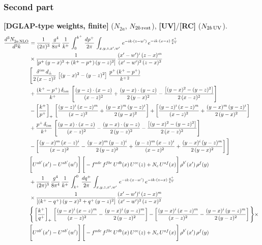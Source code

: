 \documentclass[9pt]{article}
\numberwithin{equation}{section}
\begin{document}
\subsubsection*{Second part}
\textbf{[DGLAP-type weights, finite]} ($N_{2a}$, $N_{2b\,\rm rest}$), \textbf{[UV]}/\textbf{[RC]} ($N_{2b\,\rm UV}$).
\begin{align}
    \frac{d^{3}N_{2a\,\rm NLO}^{\rm}}{d^{3}k}  & =  \frac{1}{(2\pi)^{3}}\, \frac{g^{4}}{8\pi^{4}}\,\frac{1}{k^{+}}\,\int_{0}^{k^{+}}\, \frac{dp^{+}}{2\pi}\,\int_{x,y,z,x',w'}\, e^{-ik\cdot(z-w')}\,e^{-ik\cdot (x-z)\,\frac{p^{+}}{k^{+}}}\notag \\ & \times\frac{1}{\left[p^{+}\,(y-x)^{2}+(k^{+}-p^{+})\,(y-z)^{2}\right]}\, \frac{(x'-w')^{i}\,(z-x)^{m}}{(x'-w')^{2}\,(z-x)^{2}} \notag \\ & \Bigg[\frac{\delta^{im}\,d_{\perp}}{2\,(x-z)^{2}}\,\left[(y-x)^{2}-(y-z)^{2}\right]\,\frac{p^{+}\,(k^{+}-p^{+})}{k^{+\,2}}\notag \\ & +\frac{(k^{+}-p^{+})\,\delta_{im}}{k^{+}}\,\left[\frac{(y-z)\cdot (x-z)}{(x-z)^{2}}+\frac{(y-x)\cdot (y-z)}{2\,(y-x)^{2}}-\frac{\left[(y-x)^{2}-(y-z)^{2}\right]}{2\,(x-z)^{2}}\right]\notag \\ & -\left[\frac{k^{+}}{p^{+}}\right]_{+}\,\left[\frac{(y-z)^{i}\,(x-z)^{m}}{(x-z)^{2}}+\frac{(y-x)^{m}\,(y-z)^{i}}{2\,(y-x)^{2}}\right]+ \left[\frac{(y-z)^{i}\,(x-z)^{m}}{(x-z)^{2}}+\frac{(y-x)^{m}\,(y-z)^{i}}{2\,(y-x)^{2}}\right]\notag \\ & +\frac{p^{+}\,\delta_{im}}{k^{+}}\,\left[\frac{(y-x)\cdot (x-z)}{(x-z)^{2}}-\frac{(y-x)\cdot (y-z)}{2\,(y-z)^{2}}-\frac{\left[(y-x)^{2}-(y-z)^{2}\right]}{2\,(x-z)^{2}}\right]\notag \\ &-\left[\frac{(y-x)^{m}\,(x-z)^{i}}{(x-z)^{2}}-\frac{(y-x)^{m}\,(y-z)^{i}}{2\,(y-z)^{2}}+\frac{(y-z)^{m}\,(x-z)^{i}}{(x-z)^{2}}+\frac{(y-x)^{i}\,(y-z)^{m}}{2\,(y-x)^{2}}\right]\Bigg] \notag \\ & \Bigg[U^{ab'}(x')-U^{ab'}(w')\Bigg]\,\Bigg[-f^{adc}\,f^{fbe}\,U^{db}(x)\,U^{ce}(z)+N_{c}\,U^{af}(x)\Bigg]\,\rho^{b'}(x')\,\rho^{f}(y)\notag \\ & + \frac{1}{(2\pi)^{3}}\,\frac{g^{4}}{8\pi^{4}}\,\frac{1}{k^{+}}\, \int^{0}_{k^{+}}\, \frac{dq^{+}}{2\pi} \,  \int_{x,y,z,x',w'}\,e^{-ik\cdot(x-w')}\,e^{-ik\cdot (z-x)\,\frac{q^{+}}{k^{+}}}\notag \\ & \times\frac{1}{\left[(k^{+}-q^{+})\,(y-x)^{2}+q^{+}\,(y-z)^{2}\right]}\, \frac{(x'-w')^{i}\,(z-x)^{m}}{(x'-w')^{2}\,(z-x)^{2}} \notag \\ &\Bigg\{\left[\frac{k^{+}}{q^{+}}\right]_{+}\,\left[\frac{(y-x)^{i}\,(x-z)^{m}}{(x-z)^{2}}-\frac{(y-x)^{i}\,(y-z)^{m}}{2\,(y-z)^{2}}\right] -\left[\frac{(y-x)^{i}\,(x-z)^{m}}{(x-z)^{2}}-\frac{(y-x)^{i}\,(y-z)^{m}}{2\,(y-z)^{2}}\right]\Bigg\}\times\,\notag \\ & \Bigg[U^{ab'}(x')-U^{ab'}(w')\Bigg]\,\Bigg[-f^{adc}\,f^{fbe}\,U^{db}(x)\,U^{ce}(z)+N_{c}\,U^{af}(x)\Bigg]\,\rho^{b'}(x')\,\rho^{f}(y)
\end{align} 
\end{document}
